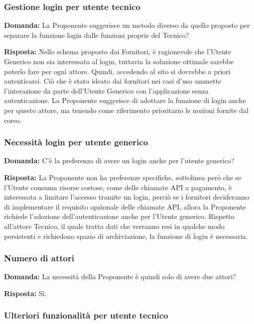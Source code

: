 \subsubsection{Gestione login per utente tecnico}

\textbf{Domanda:} La Proponente suggerisce un metodo diverso da quello proposto per separare la funzione login dalle funzioni proprie del Tecnico?

\textbf{Risposta:} Nello schema proposto dai Fornitori, è ragionevole che l'Utente Generico non sia interessato al login, tuttavia la soluzione ottimale sarebbe poterlo fare per ogni attore. Quindi, accedendo al sito si dovrebbe a priori autenticarsi.
Ciò che è stato ideato dai fornitori nei casi d’uso ammette l’interazione da parte dell’Utente Generico con l’applicazione senza autenticazione. La Proponente suggerisce di adottare la funzione di login anche per questo attore, ma tenendo come riferimento prioritario le nozioni fornite dal corso. 

\subsubsection{Necessità login per utente generico}

\textbf{Domanda:} C'è la preferenza di avere un login anche per l'utente generico?

\textbf{Risposta:} La Proponente non ha preferenze specifiche, sottolinea però che se l’Utente consuma risorse costose, come delle chiamate API a pagamento, è interessata a limitare l’accesso tramite un login, perciò se i fornitori decideranno di implementare il requisito opzionale delle chiamate API, allora la Proponente richiede l’adozione dell’autenticazione anche per l’Utente generico. Rispetto all’attore Tecnico, il quale tratta dati che verranno resi in qualche modo persistenti e richiedono spazio di archiviazione, la funzione di login è necessaria.

\subsubsection{Numero di attori}

\textbf{Domanda:} La necessità della Proponente è quindi solo di avere due attori?

\textbf{Risposta:} Sì.


\subsubsection{Ulteriori funzionalità per utente tecnico}

